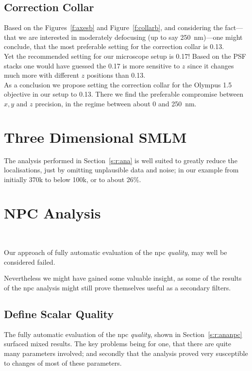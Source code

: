 \documentclass[11pt, a4paper, oneside, twocolumn]{report}
\newcommand{\e}{\emph}
\begin{document}
\subsection{Correction Collar}

Based on the Figures~\ref{f:axesb} and Figure~\ref{f:collarb}, and
considering the fact---that we are interested in moderately defocusing
(up to say \SI{250}{\nano\meter})---one might conclude, that the most
preferable setting for the correction collar is 0.13.\\

Yet the recommended setting for our microscope setup is 0.17! Based on
the PSF stacks one would have guessed the 0.17 is more sensitive to $z$
since it changes much more with different $z$ positions than 0.13.\\

As a conclusion we propose setting the correction collar for the
Olympus \SI{1.5}{\NA} objective in our setup to 0.13. There we find
the preferable compromise between $x,y$ and $z$ precision, in
the regime between about 0 and \SI{250}{\nano\meter}.


\section{Three Dimensional SMLM}

The analysis performed in Section~\ref{s:r:ana} is well suited to
greatly reduce the localisations, just by omitting unplausible data
and noise; in our example from initially 370k to below 100k, or to
about 26\%.


\section{NPC Analysis}~\label{s:d:ananpc}

Our approach of fully automatic evaluation of the \gls{npc}
\e{quality}, may well be considered failed.

Nevertheless we might have gained some valuable insight, as some of
the results of the \gls{npc} analysis might still prove themselves
useful as a secondary filters.


\subsection{Define Scalar Quality}

The fully automatic evaluation of the \gls{npc} \e{quality}, shown in
Section~\ref{s:r:ananpc} surfaced mixed results. The key problems
being for one, that there are quite many parameters involved; and
secondly that the analysis proved very susceptible to changes of most
of these parameters.\\
\end{document}
